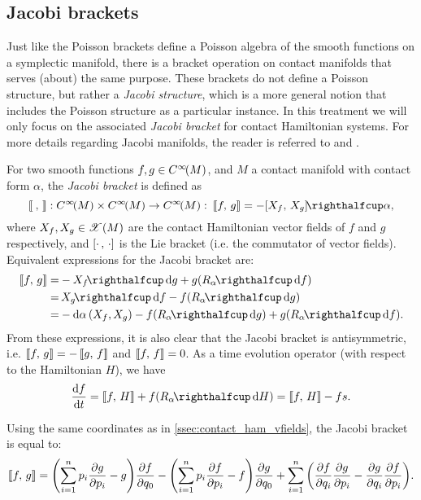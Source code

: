 \subsection{Jacobi brackets}
Just like the Poisson brackets define a Poisson algebra of the smooth functions on a symplectic manifold, there is a bracket operation on contact manifolds that serves (about) the same purpose. These brackets do not define a Poisson structure, but rather a \emph{Jacobi structure}, which is a more general notion that includes the Poisson structure as a particular instance. In this treatment we will only focus on the associated \emph{Jacobi bracket} for contact Hamiltonian systems. For more details regarding Jacobi manifolds, the reader is referred to \cite[chap. V]{Libermann1987} and \cite{DeLeon2020}.

For two smooth functions $f, g \in C^\infty\!\qty(M)$, and $M$ a contact manifold with contact form $\alpha$, the \emph{Jacobi bracket} is defined as
\begin{equation}
    \jacobi{\:}{}: \functions{M} \times \functions{M} \to \functions{M}:\: \jacobi{f}{g} = -\intpr{\liebr{X_f}{X_g}}{\alpha},
\end{equation}
where $X_f, X_g \in \mathscr{X}\qty(M)$ are the contact Hamiltonian vector fields of $f$ and $g$ respectively, and $\qty[\cdot\,,\,\cdot]$ is the Lie bracket (i.e. the commutator of vector fields). Equivalent expressions for the Jacobi bracket are: \cite{Libermann1987}
\begin{equation}
    \begin{split}
        \jacobi{f}{g} =& -\intpr{X_f}{\dd{g}} + g(\intpr{R_\alpha}{\dd{f}}) \\
                      =& \, \intpr{X_g}{\dd{f}} - f(\intpr{R_\alpha}{\dd{g}}) \\
                      =& -\dd{\alpha}(X_f, X_g) - f(\intpr{R_\alpha}{\dd{g}}) + g(\intpr{R_\alpha}{\dd{f}}).\\
    \end{split}
\end{equation}
From these expressions, it is also clear that the Jacobi bracket is antisymmetric, i.e. $\left\llbracket f,\,g\right\rrbracket = - \left\llbracket g,\,f\right\rrbracket$ and $\left\llbracket f,\,f\right\rrbracket = 0$. As a time evolution operator (with respect to the Hamiltonian $H$), we have
$$ \dv{f}{t} = \jacobi{f}{H} + f(\intpr{R_\alpha}{\dd{H}}) = \jacobi{f}{H} - fs. $$

Using the same coordinates as in \cref{ssec:contact_ham_vfields}, the Jacobi bracket is equal to:
$$ 
    \left\llbracket f,\,g\right\rrbracket = \qty(\sum_{i=1}^n p_i \pdv{g}{p_i} - g)\pdv{f}{q_0} - \qty(\sum_{i=1}^n p_i \pdv{f}{p_i} - f)\pdv{g}{q_0} 
    + \sum_{i=1}^n\qty(\pdv{f}{q_i}\pdv{g}{p_i} - \pdv{g}{q_i}\pdv{f}{p_i}).
$$

